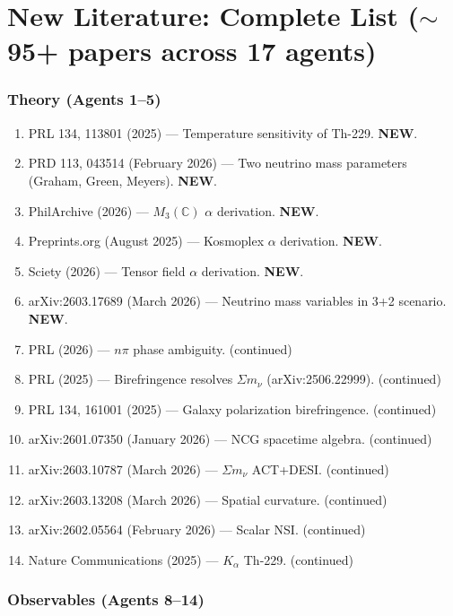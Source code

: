 \documentclass[11pt,a4paper]{article}
\newcommand{\NEW}{\textcolor{dfdblue}{\textbf{NEW}}}
\begin{document}
\part{New Literature: Complete List ($\sim$95+ papers across 17 agents)}

\section{Theory (Agents 1--5)}

\begin{enumerate}
\item PRL 134, 113801 (2025) --- Temperature sensitivity of Th-229. \NEW.
\item PRD 113, 043514 (February 2026) --- Two neutrino mass parameters (Graham, Green, Meyers). \NEW.
\item PhilArchive (2026) --- $M_3(\mathbb{C})$ $\alpha$ derivation. \NEW.
\item Preprints.org (August 2025) --- Kosmoplex $\alpha$ derivation. \NEW.
\item Sciety (2026) --- Tensor field $\alpha$ derivation. \NEW.
\item arXiv:2603.17689 (March 2026) --- Neutrino mass variables in 3+2 scenario. \NEW.
\item PRL (2026) --- $n\pi$ phase ambiguity. (continued)
\item PRL (2025) --- Birefringence resolves $\Sigma m_\nu$ (arXiv:2506.22999). (continued)
\item PRL 134, 161001 (2025) --- Galaxy polarization birefringence. (continued)
\item arXiv:2601.07350 (January 2026) --- NCG spacetime algebra. (continued)
\item arXiv:2603.10787 (March 2026) --- $\Sigma m_\nu$ ACT+DESI. (continued)
\item arXiv:2603.13208 (March 2026) --- Spatial curvature. (continued)
\item arXiv:2602.05564 (February 2026) --- Scalar NSI. (continued)
\item Nature Communications (2025) --- $K_\alpha$ Th-229. (continued)
\end{enumerate}

\section{Observables (Agents 8--14)}
\end{document}
